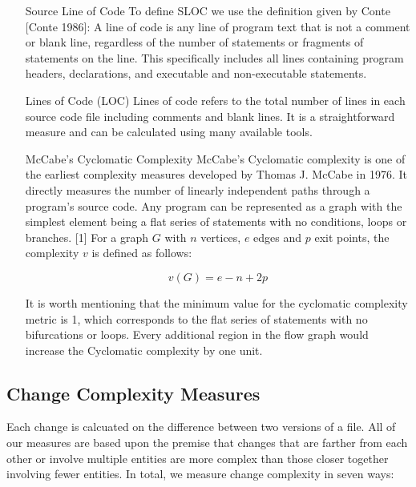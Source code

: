 \documentclass[11pt,twoside,a4paper]{article}
\begin{document}
\begin{enumerate}
\item[Source Line of Code] To define SLOC we use the definition given by Conte [Conte 1986]:
A line of code is any line of program text that is not a comment or blank line, regardless of the
number of statements or fragments of statements on the line. This specifically includes all lines containing program headers, declarations, and executable and non-executable statements.

\item[Lines of Code (LOC)]  Lines of code refers to the total number of lines in each source code file including comments and blank lines. It is a straightforward measure and can be calculated using many available tools.

\item[McCabe's Cyclomatic Complexity]
McCabe’s Cyclomatic complexity is one of the earliest complexity measures developed by Thomas J. McCabe in 1976. It directly measures the number of linearly independent paths through a program's source code. Any program can be represented as a graph with the simplest element being a flat series of statements with no conditions, loops or branches. [1] For a graph $G$ with $n$ vertices, $e$ edges and $p$ exit points, the complexity $v$ is defined as follows:

\begin{equation}
v(G)=e-n+2p
\end{equation}


It is worth mentioning that the minimum value for the cyclomatic complexity metric is 1, which corresponds to the flat series of statements with no bifurcations or loops. Every additional region in the flow graph would increase the Cyclomatic complexity by one unit.



\end{enumerate}


\subsection{Change Complexity Measures}

Each change is calcuated on the difference between two versions of a file.
%
All of our measures are based upon the premise that changes that are farther
from each other or involve multiple entities are more complex than those closer
together involving fewer entities. 
%
In total, we measure change complexity in seven ways:
\end{document}
